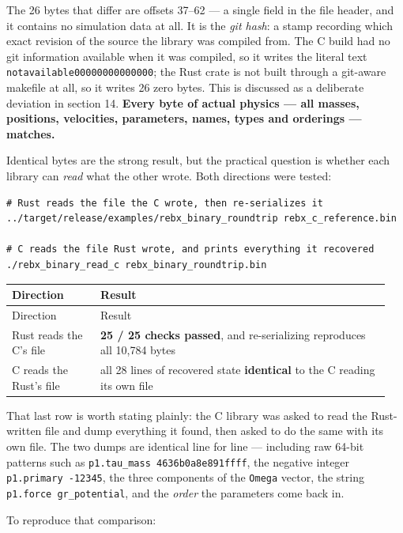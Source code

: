 \documentclass[11pt]{article}
\begin{document}
The 26 bytes that differ are offsets 37--62 --- a single field in the file header, and it contains no simulation data at all. It is the \emph{git hash}: a stamp recording which exact revision of the source the library was compiled from. The C build had no git information available when it was compiled, so it writes the literal text \texttt{notavailable00000000000000}; the Rust crate is not built through a git-aware makefile at all, so it writes 26 zero bytes. This is discussed as a deliberate deviation in section 14. \textbf{Every byte of actual physics --- all masses, positions, velocities, parameters, names, types and orderings --- matches.}

Identical bytes are the strong result, but the practical question is whether each library can \emph{read} what the other wrote. Both directions were tested:

\begin{lstlisting}
# Rust reads the file the C wrote, then re-serializes it
../target/release/examples/rebx_binary_roundtrip rebx_c_reference.bin

# C reads the file Rust wrote, and prints everything it recovered
./rebx_binary_read_c rebx_binary_roundtrip.bin
\end{lstlisting}

\begin{longtable}{L{0.223\linewidth}L{0.727\linewidth}}
\toprule
Direction & Result \\
\midrule
\endfirsthead
\toprule
Direction & Result \\
\midrule
\endhead
Rust reads the C's file & \textbf{25 / 25 checks passed}, and re-serializing reproduces all 10,784 bytes \\
C reads the Rust's file & all 28 lines of recovered state \textbf{identical} to the C reading its own file \\
\bottomrule
\end{longtable}

That last row is worth stating plainly: the C library was asked to read the Rust-written file and dump everything it found, then asked to do the same with its own file. The two dumps are identical line for line --- including raw 64-bit patterns such as \texttt{p1.tau\_mass 4636b0a8e891ffff}, the negative integer \texttt{p1.primary -12345}, the three components of the \texttt{Omega} vector, the string \texttt{p1.force gr\_potential}, and the \emph{order} the parameters come back in.

To reproduce that comparison:
\end{document}
